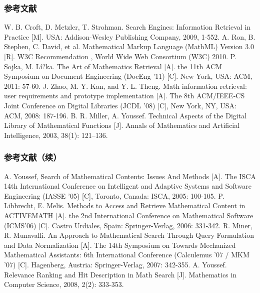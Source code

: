     \begin{frame}
        \frametitle{参考文献}
        \vspace{-1.5cm}
        \begin{thebibliography}{}
             W. B. Croft, D. Metzler, T. Strohman. Search Engines: Information Retrieval in Practice [M]. USA: Addison-Wesley Publishing Company, 2009, 1-552.
             A. Ron, B. Stephen, C. David, et al. Mathematical Markup Language (MathML) Version 3.0 [R]. W3C Recommendation , World Wide Web Consortium (W3C) 2010.
             P. Sojka, M. Lí?ka. The Art of Mathematics Retrieval [A]. the 11th ACM Symposium on Document Engineering (DocEng '11) [C]. New York, USA: ACM, 2011: 57-60.
             J. Zhao, M. Y. Kan, and Y. L. Theng. Math information retrieval: user requirements and prototype implementation [A]. The 8th ACM/IEEE-CS Joint Conference on Digital Libraries (JCDL '08) [C], New York, NY, USA: ACM, 2008: 187-196.
             B. R. Miller, A. Youssef. Technical Aspects of the Digital Library of Mathematical Functions [J]. Annals of Mathematics and Artificial Intelligence, 2003, 38(1): 121–136.
        \end{thebibliography}
    \end{frame}

    \begin{frame}
        \frametitle{参考文献（续）}
        \vspace{-1.5cm}
        \begin{thebibliography}{}
             A. Youssef,  Search of Mathematical Contents: Issues And Methods [A]. The ISCA 14th International Conference on Intelligent and Adaptive Systems and Software Engineering (IASSE '05) [C], Toronto, Canada: ISCA, 2005: 100-105.
             P. Libbrecht, E. Melis. Methods to Access and Retrieve Mathematical Content in ACTIVEMATH [A]. the 2nd International Conference on Mathematical Software (ICMS'06) [C]. Castro Urdiales, Spain: Springer-Verlag, 2006: 331-342.
             R. Miner, R. Munavalli. An Approach to Mathematical Search Through Query Formulation and Data Normalization [A]. The 14th Symposium on Towards Mechanized Mathematical Assistants: 6th International Conference (Calculemus '07 / MKM '07) [C]. Hagenberg, Austria: Springer-Verlag, 2007: 342-355.
             A. Youssef. Relevance Ranking and Hit Description in Math Search [J]. Mathematics in Computer Science, 2008, 2(2): 333-353.
        \end{thebibliography}
    \end{frame}

